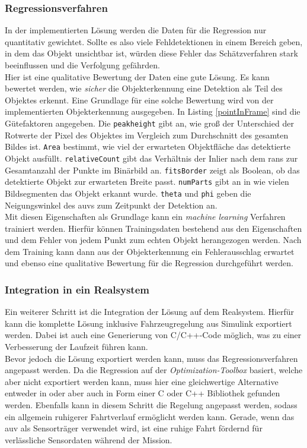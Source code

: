\subsubsection{Regressionsverfahren}
\label{sec_learnWeights}
In der implementierten Lösung werden die Daten für die Regression nur quantitativ gewichtet. Sollte es also viele Fehldetektionen in einem Bereich geben, in dem das Objekt unsichtbar ist, würden diese Fehler das Schätzverfahren stark beeinflussen und die Verfolgung gefährden.\\
Hier ist eine qualitative Bewertung der Daten eine gute Lösung. Es kann bewertet werden, wie \textit{sicher} die Objekterkennung eine Detektion als Teil des Objektes erkennt. Eine Grundlage für eine solche Bewertung wird von der implementierten Objekterkennung ausgegeben. In Listing \ref{pointInFrame} sind die Gütefaktoren angegeben. Die \texttt{peakheight} gibt an, wie groß der Unterschied der Rotwerte der Pixel des Objektes im Vergleich zum Durchschnitt des gesamten Bildes ist. \texttt{Area} bestimmt, wie viel der erwarteten Objektfläche das detektierte Objekt ausfüllt. \texttt{relativeCount} gibt das Verhältnis der Inlier nach dem \gls{rans} zur Gesamtanzahl der Punkte im Binärbild an. \texttt{fitsBorder} zeigt als Boolean, ob das detektierte Objekt zur erwarteten Breite passt. \texttt{numParts} gibt an in wie vielen Bildsegmenten das Objekt erkannt wurde. \texttt{theta} und \texttt{phi} geben die Neigungswinkel des \gls{auv}s zum Zeitpunkt der Detektion an.\\
Mit diesen Eigenschaften als Grundlage kann ein \textit{machine learning} Verfahren trainiert werden. Hierfür können Trainingsdaten bestehend aus den Eigenschaften und dem Fehler von jedem Punkt zum echten Objekt herangezogen werden. Nach dem Training kann dann aus der Objekterkennung ein Fehlerausschlag erwartet und ebenso eine qualitative Bewertung für die Regression durchgeführt werden. 

\subsubsection{Integration in ein Realsystem}
\label{sec_real}
Ein weiterer Schritt ist die Integration der Lösung auf dem Realsystem. Hierfür kann die komplette Lösung inklusive Fahrzeugregelung aus Simulink exportiert werden. Dabei ist auch eine Generierung von C/C++-Code möglich, was zu einer Verbesserung der Laufzeit führen kann.\\
Bevor jedoch die Lösung exportiert werden kann, muss das Regressionsverfahren angepasst werden. Da die Regression auf der \textit{Optimization-Toolbox} basiert, welche aber nicht exportiert werden kann, muss hier eine gleichwertige Alternative entweder in \matlab oder aber auch in Form einer C oder C++ Bibliothek gefunden werden.
Ebenfalls kann in diesem Schritt die Regelung angepasst werden, sodass ein allgemein ruhigerer Fahrtverlauf ermöglicht werden kann. Gerade, wenn das \gls{auv} als Sensorträger verwendet wird, ist eine ruhige Fahrt fördernd für verlässliche Sensordaten während der Mission.